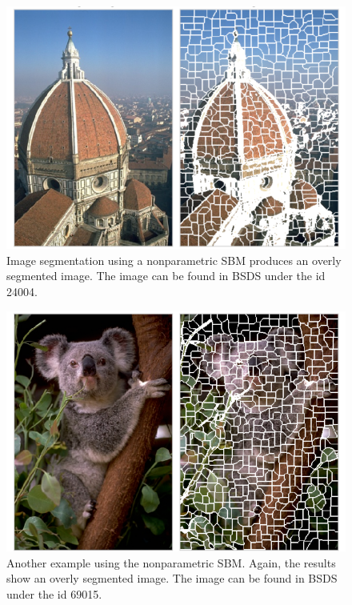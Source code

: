 \documentclass[conference]{IEEEtran}
\begin{document}
\begin{figure}[ht]
    \centering
    \includegraphics[width=\linewidth]{images/sbm_firenze.png}
    \caption{Image segmentation using a nonparametric SBM produces an overly segmented image. The image can be found in BSDS under the id 24004.}
    \label{fig:sbm_seg_firenze}
\end{figure}

\begin{figure}[ht]
    \centering
    \includegraphics[width=\linewidth]{images/sbm_koala.png}
    \caption{Another example using the nonparametric SBM. Again, the results show an overly segmented image. The image can be found in BSDS under the id 69015.}
    \label{fig:sbm_seg_koala}
\end{figure}
\end{document}
